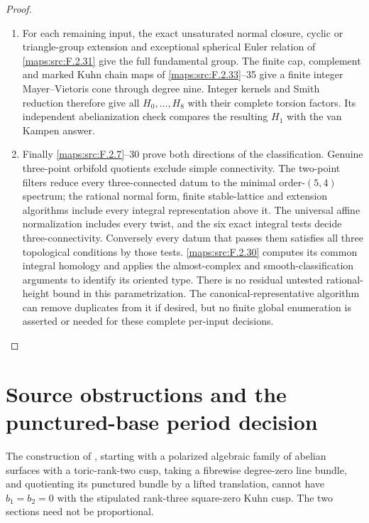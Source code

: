 \begin{proof}
\begin{enumerate}[label={$\langle1\rangle$\arabic*.}]
\item For each remaining input, the exact unsaturated normal
closure, cyclic or triangle-group extension and exceptional
spherical Euler relation of \ref{maps:src:F.2.31} give the full fundamental
group.  The finite cap, complement and marked Kuhn chain
maps of \ref{maps:src:F.2.33}--35 give a finite integer Mayer--Vietoris cone
through degree nine.  Integer kernels and Smith reduction
therefore give all $H_0,\ldots,H_8$ with their complete
torsion factors.  Its independent
abelianization check compares the resulting $H_1$ with the
van Kampen answer.

\item Finally \ref{maps:src:F.2.7}--30 prove both directions of the classification.  Genuine three-point orbifold quotients
exclude simple connectivity.  The two-point filters reduce
every three-connected datum to the minimal order-$(5,4)$ spectrum; the
rational normal form, finite stable-lattice and extension
algorithms include every integral representation above it.
The universal affine normalization includes every twist,
and the six exact integral tests decide three-connectivity. Conversely every datum that passes them satisfies all three
topological conditions by those tests.  \ref{maps:src:F.2.30} computes
its common integral homology and applies the almost-complex
and smooth-classification arguments to identify its oriented
type.  There is no residual untested rational-height bound
in this parametrization.  The canonical-representative
algorithm can remove duplicates from it if desired, but
no finite global enumeration is asserted or needed for
these complete per-input decisions.

\end{enumerate}
\end{proof}




\section{Source obstructions and the punctured-base period decision}



\begin{theorem}\hypertarget{tag-02O6}{}\label{maps:src:F.3.4}


The construction of \cite{E26}, starting with a polarized
algebraic family of abelian surfaces with a toric-rank-two cusp,
taking a fibrewise degree-zero line bundle, and quotienting its
punctured bundle by a lifted translation, cannot have $b_1=b_2=0$
with the stipulated rank-three square-zero Kuhn cusp.
The two sections need not be proportional.

\end{theorem}



